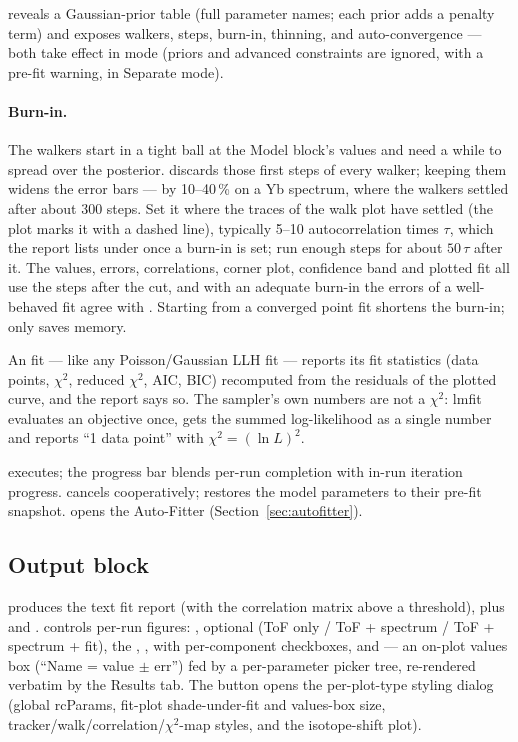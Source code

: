  reveals a Gaussian-prior table (full parameter
names; each prior adds a penalty term) and 
exposes walkers, steps, burn-in, thinning, and auto-convergence ---
both take effect in  mode (priors and advanced
constraints are ignored, with a pre-fit warning, in Separate mode).

\paragraph{Burn-in.}
The walkers start in a tight ball at the Model block's values and
need a while to spread over the posterior.  discards
those first steps of every walker; keeping them widens the error
bars --- by 10--40\,\% on a Yb spectrum, where the walkers settled
after about 300 steps. Set it where the traces of the walk plot have
settled (the plot marks it with a dashed line), typically 5--10
autocorrelation times $\tau$, which the report lists under
\code{[[Burn-in]]} once a burn-in is set; run enough steps for about
$50\,\tau$ after it. The values, errors, correlations, corner plot,
confidence band and plotted fit all use the steps after the cut, and
with an adequate burn-in the  errors of a well-behaved
fit agree with . Starting  from a converged
point fit shortens the burn-in;  only saves memory.

An  fit --- like any Poisson/Gaussian LLH fit ---
reports its fit statistics (data points, $\chi^2$, reduced $\chi^2$,
AIC, BIC) recomputed from the residuals of the plotted curve, and the
report says so. The sampler's own numbers are not a $\chi^2$: lmfit
evaluates an  objective once, gets the summed
log-likelihood as a single number and reports ``1 data point'' with
$\chi^2 = (\ln L)^2$.

 executes; the progress bar blends per-run completion
with in-run iteration progress.  cancels cooperatively;
 restores the model parameters to their pre-fit
snapshot.  opens the Auto-Fitter
(Section~\ref{sec:autofitter}).

\subsection{Output block}

 produces the text fit report (with the correlation
matrix above a  threshold), plus  and
.  controls per-run figures:
, optional  (ToF only /
ToF + spectrum / ToF + spectrum + fit), the ,
,  with
per-component checkboxes, and  --- an
on-plot values box (``Name = value $\pm$ err'') fed by a
per-parameter picker tree, re-rendered verbatim by the Results tab.
The  button opens the per-plot-type styling
dialog (global rcParams, fit-plot shade-under-fit and values-box
size, tracker/walk/correlation/$\chi^2$-map styles, and the
isotope-shift plot).

